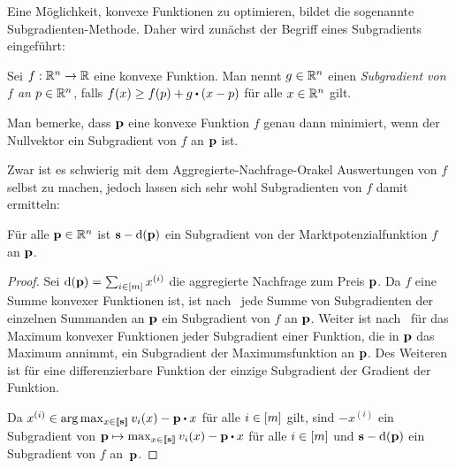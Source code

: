 Eine Möglichkeit, konvexe Funktionen zu optimieren, bildet die sogenannte Subgradienten-Methode.
Daher wird zunächst der Begriff eines Subgradients eingeführt:
\begin{definition}[Subgradient]
	Sei $f:\R^n \rightarrow \R$ eine konvexe Funktion.
	Man nennt $g\in\mathbb{R}^n$ einen \emph{Subgradient von $f$ an $p\in\R^n$}, falls $f(x) \geq f(p) + g\bcdot (x - p)$ für alle $x\in\mathbb{R}^n$ gilt.
\end{definition}
Man bemerke, dass $\mathbf{p}$ eine konvexe Funktion $f$ genau dann minimiert, wenn der Nullvektor ein Subgradient von $f$ an $\mathbf{p}$ ist.

\iffalse
\begin{proposition}\label{prop-convex-lipschitz}
Sei $f: \R^n \rightarrow \R$ eine konvexe und bezüglich $\norm{\cdot}$ Lipschitz-stetige Funktion mit Lipschitz-Konstante $L$.
Dann gilt $\norm{g}\leq L$ für jeden Subgradienten $g$ von $f$ an jedem Punkt $p\in\R^n$.
\end{proposition}
\begin{proof}
Es gilt $\norm{g} = g \bcdot (g \cdot \norm{g}^{-1}) \leq  f(g \cdot \norm{g}^{-1} + p) - f(p) \leq L \cdot \norm{g}\cdot \norm{g}^{-1} = L$.
\end{proof}
\fi

Zwar ist es schwierig mit dem Aggregierte-Nachfrage-Orakel Auswertungen von $f$ selbst zu machen, jedoch lassen sich sehr wohl Subgradienten von $f$ damit ermitteln:
\begin{lemma}\label{lemma-subgradient}
	Für alle $\mathbf{p}\in\mathbb{R}^n$ ist $\mathbf{s} - \operatorname{d}(\mathbf{p})$ ein Subgradient von der Marktpotenzialfunktion $f$ an $\mathbf{p}$.
\end{lemma}
\begin{proof}
	Sei $\operatorname{d}(\mathbf{p}) = \sum_{i\in\left[ m \right]} x^{(i)}$ die aggregierte Nachfrage zum Preis $\mathbf{p}$.
	Da $f$ eine Summe konvexer Funktionen ist, ist nach~\cite[Theorem~1.12]{Shor1985} jede Summe von Subgradienten der einzelnen Summanden an $\mathbf{p}$ ein Subgradient von $f$ an $\mathbf{p}$.
	Weiter ist nach~\cite[Theorem~1.13]{Shor1985} für das Maximum konvexer Funktionen jeder Subgradient einer Funktion, die in $\mathbf{p}$ das Maximum annimmt, ein Subgradient der Maximumsfunktion an $\mathbf{p}$.
	Des Weiteren ist für eine differenzierbare Funktion der einzige Subgradient der Gradient der Funktion.
	
	Da $x^{(i)}\in \arg\max_{x\in\ffirst{\fs}} v_i(x) - \fp \bcdot x$ für alle $i\in\left[ m \right]$ gilt, sind $-x^{(i)}$ ein Subgradient von $\fp \mapsto \max_{x\in\ffirst{\fs}} v_i(x) - \fp \bcdot x$ für alle $i\in\left[ m \right]$ und $\mathbf{s} - \operatorname{d}(\mathbf{p})$ ein Subgradient von $f$ an~$\mathbf{p}$.
\end{proof}

